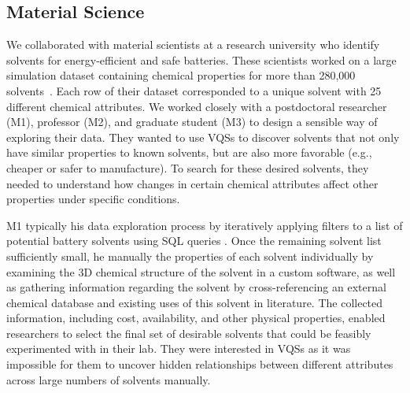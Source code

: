  \subsection{Material Science}
 \par\noindent{} 
 \npar We collaborated with material scientists at a research university who identify solvents for energy-efficient and safe batteries. These scientists worked on a large simulation dataset containing chemical properties for more than 280,000 solvents~\cite{Khetan2018}. Each row of their dataset corresponded to a unique solvent with 25 different chemical attributes. We worked closely with a postdoctoral researcher (M1), professor (M2), and graduate student (M3) to design a sensible way of exploring their data. They wanted to use VQSs to discover solvents that not only have similar properties to known solvents, but are also more favorable (e.g., cheaper or safer to manufacture). To search for these desired solvents, they needed to understand how changes in certain chemical attributes affect other properties under specific conditions.
 \par\noindent{} 
 \npar M1 typically  his data exploration process by iteratively applying filters to a list of potential battery solvents using SQL queries . Once the remaining solvent list  sufficiently small, he manually  the properties of each solvent individually by examining the 3D chemical structure of the solvent in a custom software, as well as gathering information regarding the solvent by cross-referencing an external chemical database and existing uses of this solvent in literature. The collected information, including cost, availability, and other physical properties, enabled researchers to select the final set of desirable solvents that could be feasibly experimented with in their lab. They were interested in VQSs as it was impossible for them to uncover hidden relationships between different attributes across large numbers of solvents manually.%
